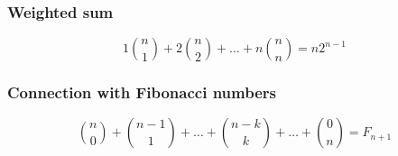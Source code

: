 \documentclass[10pt]{article}
\begin{document}
\subsubsection{Weighted sum}

\begin{displaymath}
1 \binom{n}{1} + 2 \binom{n}{2} + \dots + n \binom{n}{n} = n2^{n - 1}
\end{displaymath}

\subsubsection{Connection with Fibonacci numbers}

\begin{displaymath}
\binom{n}{0} + \binom{n - 1}{1} + \dots + \binom{n - k}{k} + \dots + \binom{0}{n} = F_{n + 1}
\end{displaymath}
\end{document}
